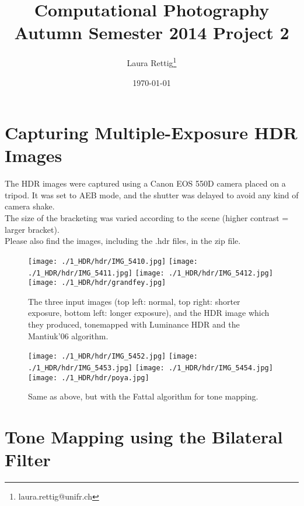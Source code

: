 \documentclass[11pt,a4paper]{article}
\title{
        Computational Photography \linebreak Autumn Semester 2014 \linebreak
        \bf{Project 2}
}
\author{
        Laura Rettig\footnote{laura.rettig@unifr.ch}
       }
\date{\normalsize \today}
\begin{document}

\maketitle

\section{Capturing Multiple-Exposure HDR Images}
The HDR images were captured using a Canon EOS 550D camera placed on a tripod. It was set to AEB mode, and the shutter was delayed to avoid any kind of camera shake.\\
The size of the bracketing was varied according to the scene (higher contrast = larger bracket).\\
Please also find the images, including the .hdr files, in the zip file.

\begin{figure}[htb]
    \begin{center}
        \texttt{[image: ./1\_HDR/hdr/IMG\_5410.jpg]}
        \texttt{[image: ./1\_HDR/hdr/IMG\_5411.jpg]}
        \texttt{[image: ./1\_HDR/hdr/IMG\_5412.jpg]}
        \texttt{[image: ./1\_HDR/hdr/grandfey.jpg]}
        \caption{The three input images (top left: normal, top right: shorter exposure, bottom left: longer exposure), and the HDR image which they produced, tonemapped with Luminance HDR and the Mantiuk'06 algorithm.}
    \end{center}
\end{figure}

\begin{figure}[htb]
    \begin{center}
        \texttt{[image: ./1\_HDR/hdr/IMG\_5452.jpg]}
        \texttt{[image: ./1\_HDR/hdr/IMG\_5453.jpg]}
        \texttt{[image: ./1\_HDR/hdr/IMG\_5454.jpg]}
        \texttt{[image: ./1\_HDR/hdr/poya.jpg]}
        \caption{Same as above, but with the Fattal algorithm for tone mapping.}
    \end{center}
\end{figure}

\newpage
\FloatBarrier

\section{Tone Mapping using the Bilateral Filter}
\end{document}

